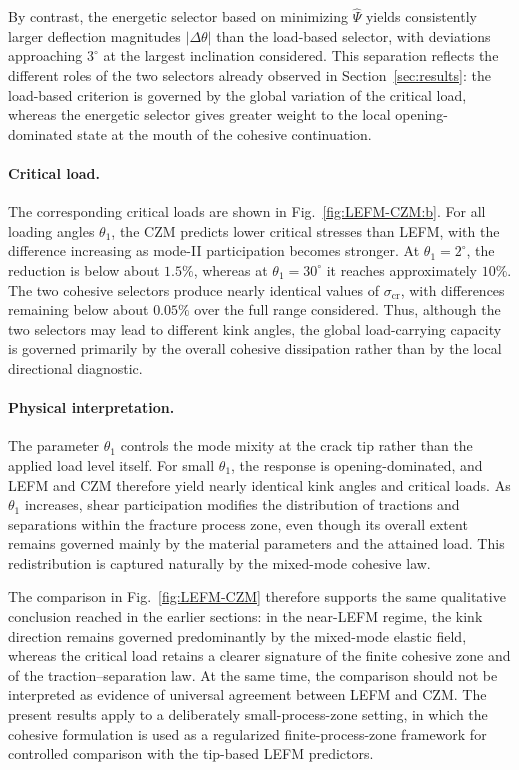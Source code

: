 \documentclass[smallextended]{svjour3}       %
\begin{document}
By contrast, the energetic selector based on minimizing \(\hat\Psi\) yields
consistently larger deflection magnitudes \(|\Delta\theta|\) than the
load-based selector, with deviations approaching \(3^\circ\) at the largest
inclination considered. This separation reflects the different roles of the
two selectors already observed in Section~\ref{sec:results}: the load-based
criterion is governed by the global variation of the critical load, whereas
the energetic selector gives greater weight to the local opening-dominated
state at the mouth of the cohesive continuation.

\paragraph{Critical load.}
The corresponding critical loads are shown in
Fig.~\ref{fig:LEFM-CZM:b}. For all loading angles \(\theta_1\), the CZM
predicts lower critical stresses than LEFM, with the difference increasing
as mode-II participation becomes stronger. At \(\theta_1=2^\circ\), the
reduction is below about \(1.5\%\), whereas at \(\theta_1=30^\circ\) it
reaches approximately \(10\%\). The two cohesive selectors produce nearly
identical values of \(\sigma_{\mathrm{cr}}\), with differences remaining
below about \(0.05\%\) over the full range considered. Thus, although the
two selectors may lead to different kink angles, the global load-carrying
capacity is governed primarily by the overall cohesive dissipation rather
than by the local directional diagnostic.

\paragraph{Physical interpretation.}
The parameter \(\theta_1\) controls the mode mixity at the crack tip rather
than the applied load level itself. For small \(\theta_1\), the response is
opening-dominated, and LEFM and CZM therefore yield nearly identical kink
angles and critical loads. As \(\theta_1\) increases, shear participation
modifies the distribution of tractions and separations within the fracture
process zone, even though its overall extent remains governed mainly by the
material parameters and the attained load. This redistribution is captured
naturally by the mixed-mode cohesive law.

The comparison in Fig.~\ref{fig:LEFM-CZM} therefore supports the same
qualitative conclusion reached in the earlier sections: in the near-LEFM
regime, the kink direction remains governed predominantly by the mixed-mode
elastic field, whereas the critical load retains a clearer signature of the
finite cohesive zone and of the traction--separation law. At the same time,
the comparison should not be interpreted as evidence of universal agreement
between LEFM and CZM. The present results apply to a deliberately
small-process-zone setting, in which the cohesive formulation is used as a
regularized finite-process-zone framework for controlled comparison with the
tip-based LEFM predictors.
\end{document}
